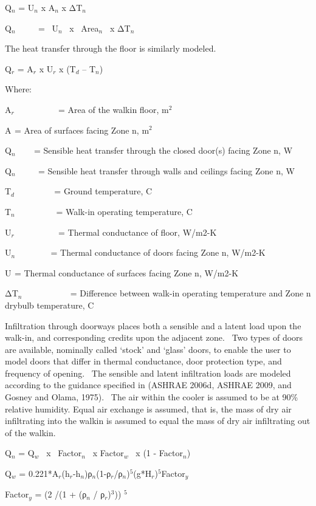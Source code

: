Q\(_{n}\) = U\(_{n}\) x A\(_{n}\) x ΔT\(_{n}\)

Q\(_{n}\) ~~~~ = ~U\(_{n}\)~ x~ Area\(_{n}\) ~x ΔT\(_{n}\)

The heat transfer through the floor is similarly modeled.

Q\(_{r}\) = A\(_{r}\) x U\(_{r}\) x (T\(_{d}\) -- T\(_{n}\))

Where:

A\(_{r}\) ~~~~~~~~~ = Area of the walkin floor, m\(^{2}\)

A\(_{ }\) = Area of surfaces facing Zone n, m\(^{2}\)

Q\(_{n}\) ~~~ = Sensible heat transfer through the closed door(s) facing Zone n, W

Q\(_{n}\) ~~~~ = Sensible heat transfer through walls and ceilings facing Zone n, W

T\(_{d}\) ~~~~~~~~ = Ground temperature, C

T\(_{n}\)~~~~~~~~~ = Walk-in operating temperature, C

U\(_{r}\) ~~~~~~~~~ = Thermal conductance of floor, W/m2-K

U\(_{n}\) ~~~~~~~ = Thermal conductance of doors facing Zone n, W/m2-K

U\(_{ }\) = Thermal conductance of surfaces facing Zone n, W/m2-K

ΔT\(_{n}\) ~~~~~~~~~~ = Difference between walk-in operating temperature and Zone n drybulb temperature, C

Infiltration through doorways places both a sensible and a latent load upon the walk-in, and corresponding credits upon the adjacent zone.~ Two types of doors are available, nominally called `stock' and `glass' doors, to enable the user to model doors that differ in thermal conductance, door protection type, and frequency of opening.~ The sensible and latent infiltration loads are modeled according to the guidance specified in (ASHRAE 2006d, ASHRAE 2009, and Gosney and Olama, 1975).~ The air within the cooler is assumed to be at 90\% relative humidity. Equal air exchange is assumed, that is, the mass of dry air infiltrating into the walkin is assumed to equal the mass of dry air infiltrating out of the walkin.

Q\(_{n}\) = Q\(_{w}\) ~x~ Factor\(_{n}\) ~x Factor\(_{w}\) ~x (1 - Factor\(_{n}\))

Q\(_{w}\) = 0.221*A\(_{r}\)(h\(_{r}\)-h\(_{n}\))ρ\(_{n}\)(1-ρ\(_{r}\)/ρ\(_{n}\))\(^{5}\)(g*H\(_{r}\))\(^{5}\)Factor\(_{y}\)

Factor\(_{y}\) = (2 /(1 + (ρ\(_{n}\) / ρ\(_{r}\))\(^{3}\))) \(^{5}\)


